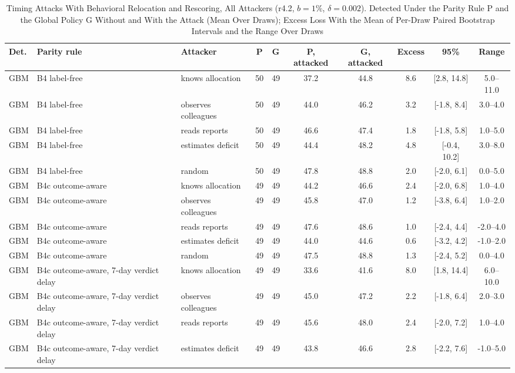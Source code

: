 \documentclass[10pt,onecolumn,letterpaper]{article}
\begin{document}
\begin{table}[!t]
\caption{Timing Attacks With Behavioral Relocation and Rescoring, All Attackers (r4.2, $b=1\%$, $\delta=0.002$). Detected Under the Parity Rule P and the Global Policy G Without and With the Attack (Mean Over Draws); Excess Loss With the Mean of Per-Draw Paired Bootstrap Intervals and the Range Over Draws\label{tab:e-l1-r42}}
\centering
\scriptsize
\setlength{\tabcolsep}{3pt}
\begin{tabular}{lllccccccc}
\toprule
Det. & Parity rule & Attacker & P & G & P, attacked & G, attacked & Excess & 95\% & Range \\
\midrule
GBM & B4 label-free & knows allocation & 50 & 49 & 37.2 & 44.8 & 8.6 & [2.8, 14.8] & 5.0--11.0 \\
GBM & B4 label-free & observes colleagues & 50 & 49 & 44.0 & 46.2 & 3.2 & [-1.8, 8.4] & 3.0--4.0 \\
GBM & B4 label-free & reads reports & 50 & 49 & 46.6 & 47.4 & 1.8 & [-1.8, 5.8] & 1.0--5.0 \\
GBM & B4 label-free & estimates deficit & 50 & 49 & 44.4 & 48.2 & 4.8 & [-0.4, 10.2] & 3.0--8.0 \\
GBM & B4 label-free & random & 50 & 49 & 47.8 & 48.8 & 2.0 & [-2.0, 6.1] & 0.0--5.0 \\
GBM & B4c outcome-aware & knows allocation & 49 & 49 & 44.2 & 46.6 & 2.4 & [-2.0, 6.8] & 1.0--4.0 \\
GBM & B4c outcome-aware & observes colleagues & 49 & 49 & 45.8 & 47.0 & 1.2 & [-3.8, 6.4] & 1.0--2.0 \\
GBM & B4c outcome-aware & reads reports & 49 & 49 & 47.6 & 48.6 & 1.0 & [-2.4, 4.4] & -2.0--4.0 \\
GBM & B4c outcome-aware & estimates deficit & 49 & 49 & 44.0 & 44.6 & 0.6 & [-3.2, 4.2] & -1.0--2.0 \\
GBM & B4c outcome-aware & random & 49 & 49 & 47.5 & 48.8 & 1.3 & [-2.4, 5.2] & 0.0--4.0 \\
GBM & B4c outcome-aware, 7-day verdict delay & knows allocation & 49 & 49 & 33.6 & 41.6 & 8.0 & [1.8, 14.4] & 6.0--10.0 \\
GBM & B4c outcome-aware, 7-day verdict delay & observes colleagues & 49 & 49 & 45.0 & 47.2 & 2.2 & [-1.8, 6.4] & 2.0--3.0 \\
GBM & B4c outcome-aware, 7-day verdict delay & reads reports & 49 & 49 & 45.6 & 48.0 & 2.4 & [-2.0, 7.2] & 1.0--4.0 \\
GBM & B4c outcome-aware, 7-day verdict delay & estimates deficit & 49 & 49 & 43.8 & 46.6 & 2.8 & [-2.2, 7.6] & -1.0--5.0 \\

\end{tabular}
\end{table}
\end{document}
